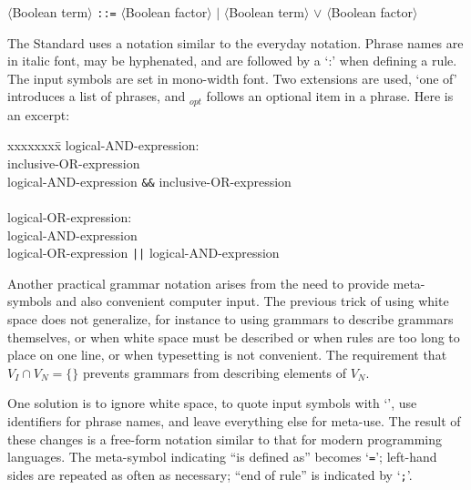 \begin{enumerate}
\begin{samepage}
\begin{center}
\begin{tabbing}
$\langle$Boolean term$\rangle$ {\tt::=}
$\langle$Boolean factor$\rangle$  
$|$ $\langle$Boolean term$\rangle$ $\vee$ 
$\langle$Boolean factor$\rangle$
\end{tabbing}
\end{center}
\end{samepage}

The   Standard uses a notation 
similar to the everyday notation.  
Phrase names are in italic font, 
may be hyphenated, and are followed by a `:' when defining a rule.  
The input symbols are set in mono-width font.
Two extensions are used, `one of' introduces a list of phrases, 
and $_{opt}$ follows an optional item in a phrase.  Here is an excerpt:

\begin{em}
\begin{tabbing}
xxxxxxxx\=\kill
logical-AND-expression:                                  \\
\>inclusive-OR-expression                                \\
\>logical-AND-expression \verb+&&+ inclusive-OR-expression  \\
\\
logical-OR-expression:                                   \\
\> logical-AND-expression                                \\
\> logical-OR-expression \verb+||+ logical-AND-expression
\end{tabbing}
\end{em}

Another practical grammar notation arises from the need to provide 
meta-symbols and also convenient computer input.  
The previous trick of using white space does not generalize, 
for instance to using grammars to describe grammars themselves,
or when white space must be described 
or when rules are too long to place on one line, 
or when typesetting is not convenient.  
The requirement that $V_I\cap V_N = \{\}$ prevents grammars 
from describing elements of $V_N$.

One solution is to ignore white space,
to quote input symbols with `\sq', 
use identifiers for phrase names, and leave 
everything else for meta-use.  
The result of these changes is a free-form notation 
similar to that for modern programming languages.  
The meta-symbol indicating ``is defined as'' becomes `{\tt=}';
left-hand sides are repeated as often as necessary; 
``end of rule'' is indicated by `{\tt;}'.


\end{enumerate}
